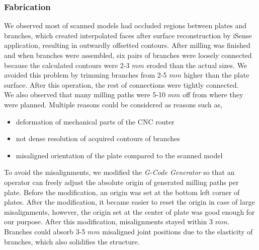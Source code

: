 \subsubsection*{Fabrication}
We observed most of scanned models had occluded regions between plates and branches, which created interpolated faces after surface reconstruction by iSense application, resulting in outwardly offsetted contours. After milling was finished and when branches were assembled, six pairs of branches were loosely connected because the calculated contours were 2-3 $mm$ eroded than the actual sizes.
We avoided this problem by trimming branches from 2-5 $mm$ higher than the plate surface.
After this operation, the rest of connections were tightly connected. \\

We also observed that many milling paths were 5-10 $mm$ off from where they were planned.
Multiple reasons could be considered as reasons such as,

\begin{itemize}
  \item{deformation of mechanical parts of the CNC router}
  \item{not dense resolution of acquired contours of branches}
  \item{misaligned orientation of the plate compared to the scanned model}
\end{itemize}

To avoid the misalignments, we modified the \textit{G-Code Generator} so that an operator can freely adjust the absolute origin of generated milling paths per plate.
Before the modification, an origin was set at the bottom left corner of plates.
After the modification, it became easier to reset the origin in case of large misalignments, however, the origin set at the center of plate was good enough for our purpose.
After this modification, misalignments stayed within 3 $mm$.
Branches could absorb 3-5 $mm$ misaligned joint positions due to the elasticity of branches, which also solidifies the structure.
